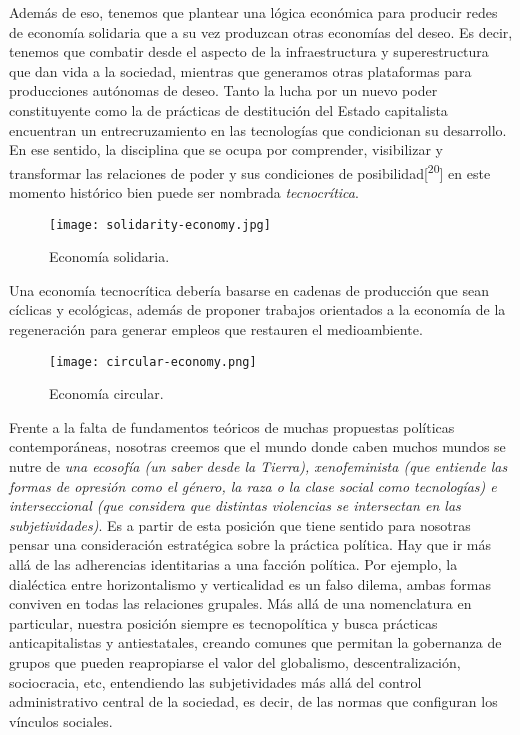Además de eso, tenemos que plantear una lógica económica para producir redes de economía solidaria que a su vez produzcan otras economías del deseo. Es decir, tenemos que combatir desde el aspecto de la infraestructura y superestructura que dan vida a la sociedad, mientras que generamos otras plataformas para producciones autónomas de deseo. Tanto la lucha por un nuevo poder constituyente como la de prácticas de destitución del Estado capitalista encuentran un entrecruzamiento en las tecnologías que condicionan su desarrollo. En ese sentido, la disciplina que se ocupa por comprender, visibilizar y transformar las relaciones de poder y sus condiciones de posibilidad[\textsuperscript{20}] en este momento histórico bien puede ser nombrada \emph{tecnocrítica}.

\begin{figure}[htbp]
	\centering
	\texttt{[image: solidarity-economy.jpg]}
	\caption{Economía solidaria.}
	\label{fig:solidarieco}
\end{figure}

Una economía tecnocrítica debería basarse en cadenas de producción que sean cíclicas y ecológicas, además de proponer trabajos orientados a la economía de la regeneración para generar empleos que restauren el medioambiente.

\begin{figure}[htbp]
	\centering
	\texttt{[image: circular-economy.png]}
	\caption{Economía circular.}
	\label{fig:circuleco}
\end{figure}

Frente a la falta de fundamentos teóricos de muchas propuestas políticas contemporáneas, nosotras creemos que el mundo donde caben muchos mundos se nutre de \emph{una ecosofía (un saber desde la Tierra), xenofeminista (que entiende las formas de opresión como el género, la raza o la clase social como tecnologías) e interseccional (que considera que distintas violencias se intersectan en las subjetividades)}. Es a partir de esta posición que tiene sentido para nosotras pensar una consideración estratégica sobre la práctica política. Hay que ir más allá de las adherencias identitarias a una facción política. Por ejemplo, la dialéctica entre horizontalismo y verticalidad es un falso dilema, ambas formas conviven en todas las relaciones grupales. Más allá de una nomenclatura en particular, nuestra posición siempre es tecnopolítica y busca prácticas anticapitalistas y antiestatales, creando comunes que permitan la gobernanza de grupos que pueden reapropiarse el valor del globalismo, descentralización, sociocracia, etc, entendiendo las subjetividades más allá del control administrativo central de la sociedad, es decir, de las normas que configuran los vínculos sociales.

